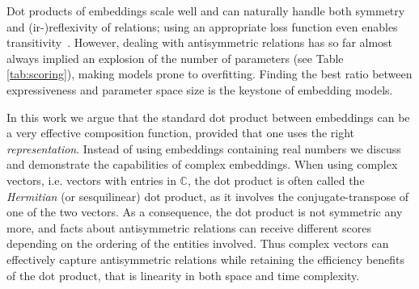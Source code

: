 \documentclass{article}
\newcommand{\complexSpace}{\mathbb{C}}
\def\tt{\texttt}
\begin{document}
Dot products of embeddings scale well and can naturally handle both symmetry and (ir-)reflexivity of relations; using an appropriate loss function even enables transitivity~\cite{bouchard2015}.
However, dealing with antisymmetric relations has so far almost always implied an explosion of the number of parameters \cite{Nickel2011,socher2013reasoning} (see Table \ref{tab:scoring}), making models prone to overfitting. Finding the best ratio between expressiveness and parameter space size is the keystone of embedding models.

In this work we argue that the standard dot product between embeddings can be a very effective composition function, provided that one uses the right \emph{representation}. Instead of using embeddings containing real numbers we discuss and demonstrate the capabilities of complex embeddings. When using complex vectors, i.e. vectors with entries in $\complexSpace$,  the dot product is often called the \emph{Hermitian} (or sesquilinear) dot product, as it involves the conjugate-transpose of one of the two vectors. 
As a consequence, the dot product is not symmetric any more, and facts about antisymmetric relations can receive different scores depending on the ordering of the entities involved.
Thus complex vectors can effectively capture antisymmetric relations while retaining the efficiency benefits of the dot product, that is linearity in both space and time complexity. %

\end{document}
